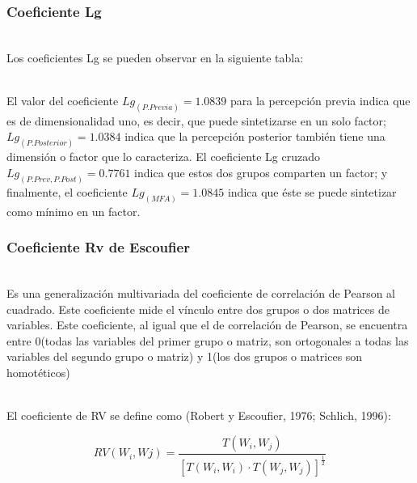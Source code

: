 \documentclass[12pt]{beamer}
\begin{document}
\begin{frame}
\frametitle{Coeficiente Lg}
~\\Los coeficientes Lg se pueden observar en la siguiente tabla:
\begin{center}
\end{center}
~\\El valor del coeficiente $Lg_{(P.Previa)}=1.0839$ para la percepción previa indica que es de dimensionalidad uno, es decir, que puede sintetizarse en un solo factor; $Lg_{(P.Posterior)}=1.0384$ indica que la percepción posterior también tiene una dimensión o factor que lo caracteriza. El coeficiente Lg cruzado $Lg_{(P.Prev,P.Post)}=0.7761$ indica que estos dos grupos comparten un factor; y finalmente, el coeficiente $Lg_{(MFA)}=1.0845$ indica que éste se puede sintetizar como mínimo en un factor.
\end{frame}

\begin{frame}
\frametitle{Coeficiente Rv de Escoufier}
~\\ Es una generalización multivariada del coeficiente de correlación de Pearson al cuadrado. Este coeficiente mide el vínculo entre dos grupos o dos matrices de variables. Este coeficiente, al igual que el de correlación de Pearson, se encuentra entre 0(todas las variables del primer grupo o matriz, son ortogonales a todas las variables del segundo grupo o matriz) y 1(los dos grupos o matrices son homotéticos)

~\\El coeficiente de RV se define como (Robert y Escoufier, 1976; Schlich, 1996):

$$RV(W_i,Wj)=\frac{T(W_i,W_j)}{\left[T(W_i,W_i)\cdot T(W_j,W_j)\right]^\frac{1}{2}}$$
\end{frame}
\end{document}
